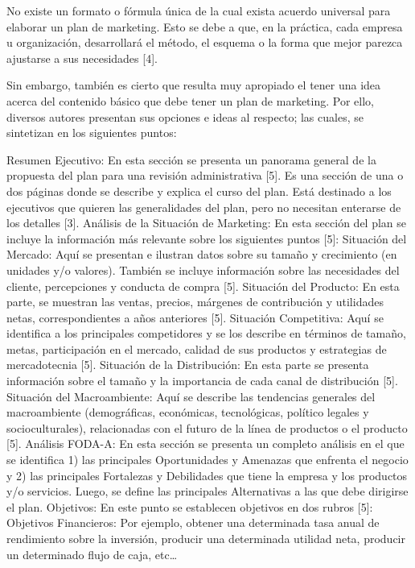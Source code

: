 \documentclass[
]{book}
\begin{document}
No existe un formato o fórmula única de la cual exista acuerdo universal para elaborar un plan de marketing. Esto se debe a que, en la práctica, cada empresa u organización, desarrollará el método, el esquema o la forma que mejor parezca ajustarse a sus necesidades {[}4{]}.

Sin embargo, también es cierto que resulta muy apropiado el tener una idea acerca del contenido básico que debe tener un plan de marketing. Por ello, diversos autores presentan sus opciones e ideas al respecto; las cuales, se sintetizan en los siguientes puntos:

Resumen Ejecutivo: En esta sección se presenta un panorama general de la propuesta del plan para una revisión administrativa {[}5{]}. Es una sección de una o dos páginas donde se describe y explica el curso del plan. Está destinado a los ejecutivos que quieren las generalidades del plan, pero no necesitan enterarse de los detalles {[}3{]}.
Análisis de la Situación de Marketing: En esta sección del plan se incluye la información más relevante sobre los siguientes puntos {[}5{]}:
Situación del Mercado: Aquí se presentan e ilustran datos sobre su tamaño y crecimiento (en unidades y/o valores). También se incluye información sobre las necesidades del cliente, percepciones y conducta de compra {[}5{]}.
Situación del Producto: En esta parte, se muestran las ventas, precios, márgenes de contribución y utilidades netas, correspondientes a años anteriores {[}5{]}.
Situación Competitiva: Aquí se identifica a los principales competidores y se los describe en términos de tamaño, metas, participación en el mercado, calidad de sus productos y estrategias de mercadotecnia {[}5{]}.
Situación de la Distribución: En esta parte se presenta información sobre el tamaño y la importancia de cada canal de distribución {[}5{]}.
Situación del Macroambiente: Aquí se describe las tendencias generales del macroambiente (demográficas, económicas, tecnológicas, político legales y socioculturales), relacionadas con el futuro de la línea de productos o el producto {[}5{]}.
Análisis FODA-A: En esta sección se presenta un completo análisis en el que se identifica 1) las principales Oportunidades y Amenazas que enfrenta el negocio y 2) las principales Fortalezas y Debilidades que tiene la empresa y los productos y/o servicios. Luego, se define las principales Alternativas a las que debe dirigirse el plan.
Objetivos: En este punto se establecen objetivos en dos rubros {[}5{]}:
Objetivos Financieros: Por ejemplo, obtener una determinada tasa anual de rendimiento sobre la inversión, producir una determinada utilidad neta, producir un determinado flujo de caja, etc\ldots{}
\end{document}
